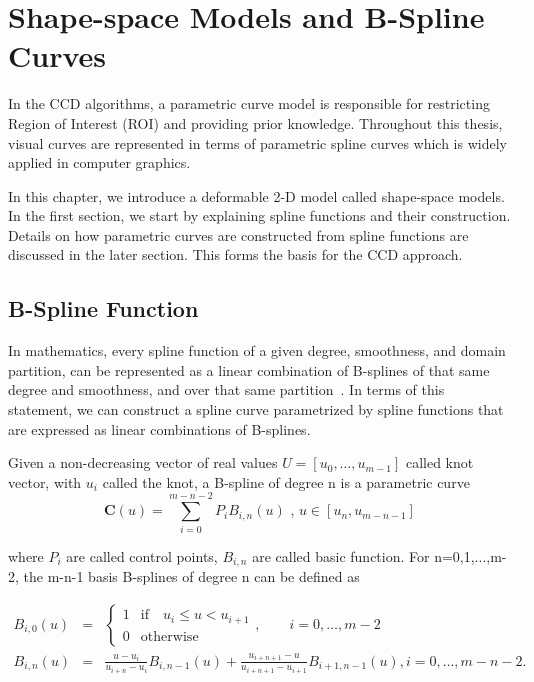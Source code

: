 \chapter{Shape-space Models and B-Spline Curves}
\label{chapter:bspline}
In the CCD algorithms, a parametric curve model is responsible for
restricting Region of Interest (ROI) and providing prior knowledge. 
Throughout this thesis, visual curves are represented in terms of
parametric spline curves which is widely applied in computer graphics.

In this chapter, we introduce a deformable 2-D model called
shape-space models.  In the first section, we start by explaining
spline functions and their construction. Details on how parametric
curves are constructed from spline functions are discussed in the
later section. This forms the basis for the CCD approach.
\section{B-Spline Function}
\label{sec:bsc}
In mathematics, every spline function of a given degree,
smoothness, and domain partition, can be represented as a linear
combination of B-splines of that same degree and smoothness, and over
that same partition~\cite{press2007numerical}. In terms of this statement, we can
construct  a spline curve parametrized by spline functions that are
expressed as linear combinations of B-splines. 

Given a non-decreasing vector of real values $U = [u_0, \ldots,
u_{m-1}]$ called knot vector, with $u_i$ called the knot, a
B-spline of degree n is a parametric curve
\begin{equation}
  \label{eq:4.1}
  \mathbf{C}(u) =  \sum_{i=0}^{m-n-2} P_{i} B_{i,n}(u) \mbox{ , } u \in [u_{n},u_{m-n-1}]
\end{equation}

where $P_i$ are called control points, $B_{i,n}$ are called
basic function. For n=0,1,...,m-2, the m-n-1 basis B-splines of degree
n can be defined as 

\begin{eqnarray}
  \label{eq:4.2}
  B_{i,0}(u) &=&  \left\{
\begin{matrix} 
1 & \mathrm{if} \quad u_i \leq u < u_{i+1} \\
0 & \mathrm{otherwise} 
\end{matrix}
\right.,\qquad i=0,\ldots, m{-}2 \nonumber\\
B_{i,n}(u) &=& \frac{u - u_i}{u_{i+n} - u_i} B_{i,n-1}(u) + \frac{u_{i+n+1} - u}{u_{i+n+1} - u_{i+1}} B_{i+1,n-1}(u)
, i=0,\ldots, m{-}n{-}2.  
\end{eqnarray}

